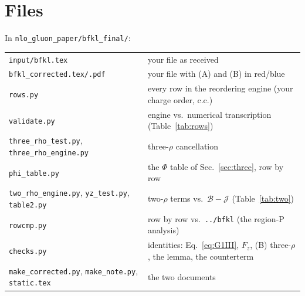 \documentclass[10pt]{article}
\numberwithin{equation}{section}
\newcommand{\BB}{\mathcal B}
\newcommand{\JJ}{\mathcal J}
\begin{document}
\section{Files}\label{sec:files}
In \texttt{nlo\_gluon\_paper/bfkl\_final/}:
\begin{center}\small
\begin{tabular}{@{}ll@{}}\toprule
\texttt{input/bfkl.tex} & your file as received\\
\texttt{bfkl\_corrected.tex/.pdf} & your file with (A) and (B) in red/blue\\
\texttt{rows.py} & every row in the reordering engine (your charge order, c.c.)\\
\texttt{validate.py} & engine vs.\ numerical transcription (Table~\ref{tab:rows})\\
\texttt{three\_rho\_test.py}, \texttt{three\_rho\_engine.py} & three-$\rho$ cancellation\\
\texttt{phi\_table.py} & the $\Phi$ table of Sec.~\ref{sec:three}, row by row\\
\texttt{two\_rho\_engine.py}, \texttt{yz\_test.py}, \texttt{table2.py} & two-$\rho$ terms vs.\ $\BB-\JJ$ (Table~\ref{tab:two})\\
\texttt{rowcmp.py} & row by row vs.\ \texttt{../bfkl} (the region-P analysis)\\
\texttt{checks.py} & identities: Eq.~\eqref{eq:G1III}, $F_z$, (B) three-$\rho$, the lemma, the counterterm\\
\texttt{make\_corrected.py}, \texttt{make\_note.py}, \texttt{static.tex} & the two documents\\\bottomrule
\end{tabular}
\end{center}
\end{document}
